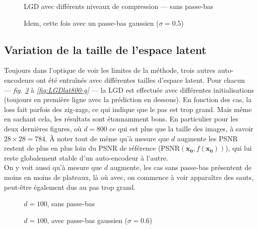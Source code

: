 \documentclass[hidelinks, french]{article} %
\renewcommand{\bf}[1]{\boldsymbol{#1}}
\theoremstyle{enonce}
\theoremstyle{special}
\theoremstyle{rq}
\theoremstyle{exo}
\theoremstyle{demo}
\begin{document}
\begin{figure}[H]\centering
	
	\caption{LGD avec différents niveaux de compression --- sans passe-bas}
	\label{fig:LGDsizes-s}
\end{figure}

\begin{figure}[H]\centering
	
	\caption{Idem, cette fois avec un passe-bas gaussien ($\sigma=0.5$)}
	\label{fig:LGDsizes-g}
\end{figure}


\vfill



\subsection{Variation de la taille de l'espace latent}\label{sec:LGDlat}

Toujours dans l'optique de voir les limites de la méthode, trois autres auto-encodeurs ont été entraînés avec différentes tailles d'espace latent. Pour chacun --- \textit{fig. \ref{fig:LGDlat100-s}} à \textit{ \ref{fig:LGDlat800-g}} --- la LGD est effectuée avec différentes initialisations (toujours en première ligne avec la prédiction en dessous). En fonction des cas, la loss fait parfois des zig-zags, ce qui indique que le pas est trop grand. Mais même en sachant cela, les résultats sont étonnamment bons. En particulier pour les deux dernières figures, où $d=800$ ce qui est plus que la taille des images, à savoir $28\times28=784$. \`A noter tout de même qu'à mesure que $d$ augmente les PSNR restent de plus en plus loin du PSNR de référence (PSNR$(\bf{x_0}, f(\bf{x_0}))$), qui lui reste globalement stable d'un auto-encodeur à l'autre.
\\
On y voit aussi qu'à mesure que $d$ augmente, les cas sans passe-bas présentent de moins en moins de plateaux, là où avec, on commence à voir apparaître des sauts, peut-être également dus au pas trop grand.

\vfill

\newpage

\begin{figure}[H]\centering
	
	\caption{$d=100$, sans passe-bas}
	\label{fig:LGDlat100-s}
\end{figure}

\begin{figure}[H]\centering
	
	\caption{$d=100$, avec passe-bas gaussien ($\sigma=0.6$)}
	\label{fig:LGDlat100-g}
\end{figure}
\end{document}
